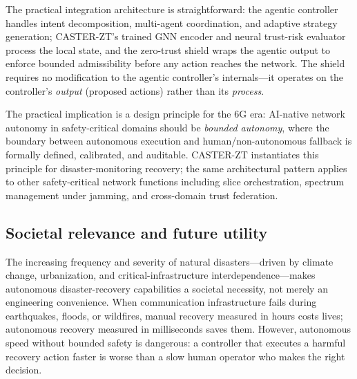 \documentclass[10pt,journal,compsoc]{IEEEtran}
\begin{document}
The practical integration architecture is straightforward: the agentic controller handles intent decomposition, multi-agent coordination, and adaptive strategy generation; CASTER-ZT's trained GNN encoder and neural trust-risk evaluator process the local state, and the zero-trust shield wraps the agentic output to enforce bounded admissibility before any action reaches the network.  The shield requires no modification to the agentic controller's internals---it operates on the controller's \emph{output} (proposed actions) rather than its \emph{process}.

The practical implication is a design principle for the 6G era: AI-native network autonomy in safety-critical domains should be \emph{bounded autonomy}, where the boundary between autonomous execution and human/non-autonomous fallback is formally defined, calibrated, and auditable.
CASTER-ZT instantiates this principle for disaster-monitoring recovery; the same architectural pattern applies to other safety-critical network functions including slice orchestration, spectrum management under jamming, and cross-domain trust federation.

\subsection{Societal relevance and future utility}
The increasing frequency and severity of natural disasters---driven by climate change, urbanization, and critical-infrastructure interdependence---makes autonomous disaster-recovery capabilities a societal necessity, not merely an engineering convenience.
When communication infrastructure fails during earthquakes, floods, or wildfires, manual recovery measured in hours costs lives; autonomous recovery measured in milliseconds saves them.
However, autonomous speed without bounded safety is dangerous: a controller that executes a harmful recovery action faster is worse than a slow human operator who makes the right decision.
\end{document}

